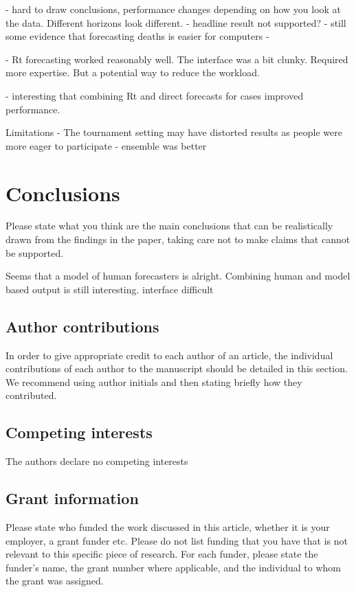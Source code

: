 \documentclass[10pt,a4paper,twocolumn]{article}
\begin{document}
- hard to draw conclusions, performance changes depending on how you look at the data. Different horizons look different. 
- headline result not supported? 
- still some evidence that forecasting deaths is easier for computers
- 

- Rt forecasting worked reasonably well. The interface was a bit clunky. Required more expertise. But a potential way to reduce the workload. 

- interesting that combining Rt and direct forecasts for cases improved performance. 


Limitations
- The tournament setting may have distorted results as people were more eager to participate
- ensemble was better


\section*{Conclusions}
Please state what you think are the main conclusions that can be realistically drawn from the findings in the paper, taking care not to make claims that cannot be supported.

Seems that a model of human forecasters is alright. Combining human and model based output is still interesting. 
interface difficult











\subsection*{Author contributions}
In order to give appropriate credit to each author of an article, the individual
contributions of each author to the manuscript should be detailed in this section. We
recommend using author initials and then stating briefly how they contributed.

\subsection*{Competing interests}
The authors declare no competing interests

\subsection*{Grant information}
Please state who funded the work discussed in this article, whether it is your employer,
a grant funder etc. Please do not list funding that you have that is not relevant to this
specific piece of research. For each funder, please state the funder’s name, the grant
number where applicable, and the individual to whom the grant was assigned.
\end{document}
